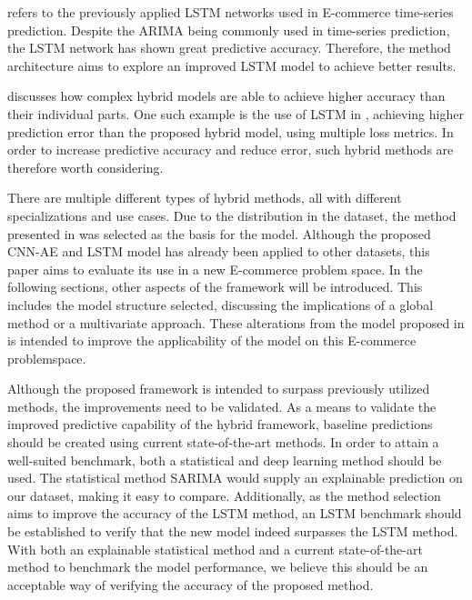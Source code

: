 refers to the previously applied LSTM networks used in E-commerce time-series prediction.
Despite the ARIMA being commonly used in time-series prediction, the LSTM network has shown great predictive accuracy.
Therefore, the method architecture aims to explore an improved LSTM model to achieve better results.

discusses how complex hybrid models are able to achieve higher accuracy than their individual parts.
One such example is the use of LSTM in \cite{Zhao2019}, achieving higher prediction error than the proposed hybrid model, using multiple loss metrics.
In order to increase predictive accuracy and reduce error, such hybrid methods are therefore worth considering.


There are multiple different types of hybrid methods, all with different specializations and use cases.
Due to the distribution in the dataset, the method presented in \cite{Zhao2019} was selected as the basis for the model.
Although the proposed CNN-AE and LSTM model has already been applied to other datasets, this paper aims to evaluate its use in a new E-commerce problem space.
In the following sections, other aspects of the framework will be introduced.
This includes the model structure selected, discussing the implications of a global method or a multivariate approach.
These alterations from the model proposed in \cite{Zhao2019} is intended to improve the applicability of the model on this E-commerce problemspace.


Although the proposed framework is intended to surpass previously utilized methods,
the improvements need to be validated.
As a means to validate the improved predictive capability of the hybrid framework,
baseline predictions should be created using current state-of-the-art methods.
In order to attain a well-suited benchmark, both a statistical and deep learning method should be used.
The statistical method SARIMA would supply an explainable prediction on our dataset, making it easy to compare.
Additionally, as the method selection aims to improve the accuracy of the LSTM method,
an LSTM benchmark should be established to verify that the new model indeed surpasses the LSTM method.
With both an explainable statistical method and a current state-of-the-art method to benchmark the model performance,
we believe this should be an acceptable way of verifying the accuracy of the proposed method.

